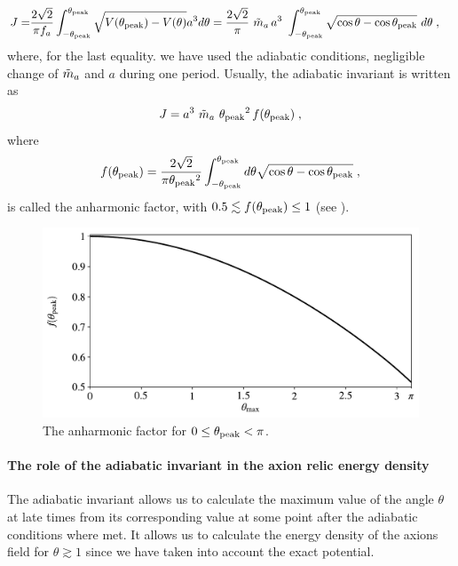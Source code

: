 \documentclass[11pt,a4paper]{article}
\begin{document}
\begin{eqnarray}
	J=&  \dfrac{2 \sqrt{2} }{\pi f_{a}{}}  \int_{- \theta_{\rm peak}{}} ^{\theta_{\rm peak}{}}  \sqrt{ V(\theta_{\rm peak}{}) - V(\theta) } a^{3} d \theta = 
	\dfrac{2 \sqrt{2} }{\pi} \ \tilde m_{a}{} \, a^3 \ \displaystyle \int_{- \theta_{\rm peak}{}}^{\theta_{\rm peak}{}} \sqrt{\cos \theta - \cos \theta_{\rm peak}{}} \ d \theta  
	\;,
	\label{eq:J_axion_derivation}
\end{eqnarray}
%
where, for the last equality. we have used the adiabatic conditions, \ie negligible change of $\tilde m_{a}{}$ and $a$ during one period. Usually, the adiabatic invariant is written as~\cite{Lyth:1991ub,Bae:2008ue} 
%
\begin{equation}
	J = a^3 \ \tilde m_{a}{} \ \theta_{\rm peak}{}^2  \, f(\theta_{\rm peak}{})  \;,
	\label{eq:J_axion_final_form}
\end{equation}
%
where 
\begin{equation}
	f(\theta_{\rm peak}{}) =\dfrac{ 2 \sqrt{2}}{\pi \theta_{\rm peak}{}^2 } \displaystyle \int_{- \theta_{\rm peak}{}}^{\theta_{\rm peak}{}} d \theta \sqrt{ \cos \theta - \cos \theta_{\rm peak}{} } \;,
	\label{eq:anharmonic_f}
\end{equation}
%
is called the anharmonic factor, with $ 0.5 \lesssim f(\theta_{\rm peak}{}) \leq 1$ (see ).


\begin{figure}[t]
	\includegraphics[width=1\textwidth]{figs/anharmonic_factor.pdf}
	\caption{The anharmonic factor for $0 \leq \theta_{\rm peak}{} < \pi $.}
	\label{fig:anharmonic_factor}
\end{figure}



\paragraph{The role of the adiabatic invariant in the axion relic energy density}
%
The adiabatic invariant allows us to calculate the maximum value of the angle $\theta$ at late times from its corresponding value at some point after the adiabatic conditions where met. It allows us to calculate the energy density of the axions field for $\theta \gtrsim 1$ since we have taken into account the exact potential.
\end{document}
